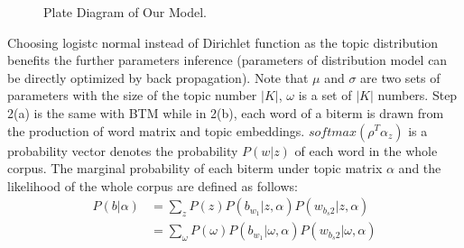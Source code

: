 \begin{figure}[!htp]
    \centering
    \caption{Plate Diagram of Our Model.}
    \label{fig:nbtm}
\end{figure}
Choosing logistc normal instead of Dirichlet function as the topic distribution benefits the further parameters inference (parameters of distribution model can be directly optimized by back propagation). Note that $\mu$ and $\sigma$ are two sets of parameters with the size of the topic number $|K|$, $\omega$ is a set of $|K|$ numbers. Step 2(a) is the same with BTM while in 2(b), each word of a biterm is drawn from the production of word matrix and topic embeddings. $softmax(\rho^T\alpha_z)$ is a probability vector denotes the probability $P(w|z)$ of each word in the whole corpus. The marginal probability of each biterm under topic matrix $\alpha$ and the likelihood of the whole corpus are defined as follows:
\begin{equation}
    \begin{aligned}
        P(b|\alpha) & = \sum_zP(z)P(b_{w_1}|z,\alpha)P(w_{b_s2}|z,\alpha) \\
        & = \sum_\omega P(\omega)P(b_{w_1}|\omega,\alpha)P(w_{b_s2}|\omega,\alpha) 
    \end{aligned}
    \label{eq:biterm}
\end{equation}

